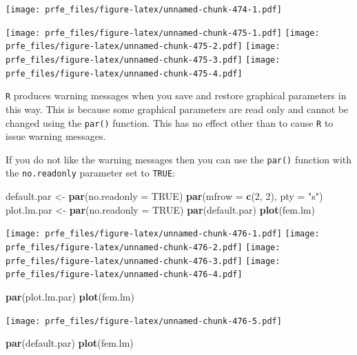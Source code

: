 \documentclass[12pt,a4paper]{book}
\newenvironment{Shaded}{\begin{snugshade}}{\end{snugshade}}
\newcommand{\DataTypeTok}[1]{\textcolor[rgb]{0.13,0.29,0.53}{#1}}
\newcommand{\DecValTok}[1]{\textcolor[rgb]{0.00,0.00,0.81}{#1}}
\newcommand{\KeywordTok}[1]{\textcolor[rgb]{0.13,0.29,0.53}{\textbf{#1}}}
\newcommand{\NormalTok}[1]{#1}
\newcommand{\OtherTok}[1]{\textcolor[rgb]{0.56,0.35,0.01}{#1}}
\newcommand{\StringTok}[1]{\textcolor[rgb]{0.31,0.60,0.02}{#1}}
\theoremstyle{definition}
\theoremstyle{definition}
\theoremstyle{definition}
\theoremstyle{remark}
\begin{document}
\texttt{[image: prfe\_files/figure-latex/unnamed-chunk-474-1.pdf]}

\texttt{[image: prfe\_files/figure-latex/unnamed-chunk-475-1.pdf]}
\texttt{[image: prfe\_files/figure-latex/unnamed-chunk-475-2.pdf]}
\texttt{[image: prfe\_files/figure-latex/unnamed-chunk-475-3.pdf]}
\texttt{[image: prfe\_files/figure-latex/unnamed-chunk-475-4.pdf]}

\texttt{R} produces warning messages when you save and restore graphical
parameters in this way. This is because some graphical parameters are
read only and cannot be changed using the \texttt{par()} function. This
has no effect other than to cause \texttt{R} to issue warning messages.

If you do not like the warning messages then you can use the
\texttt{par()} function with the \texttt{no.readonly} parameter set to
\texttt{TRUE}:

\begin{Shaded}
\begin{Highlighting}[]
\NormalTok{default.par <-}\StringTok{ }\KeywordTok{par}\NormalTok{(}\DataTypeTok{no.readonly =} \OtherTok{TRUE}\NormalTok{)}
\KeywordTok{par}\NormalTok{(}\DataTypeTok{mfrow =} \KeywordTok{c}\NormalTok{(}\DecValTok{2}\NormalTok{, }\DecValTok{2}\NormalTok{), }\DataTypeTok{pty =} \StringTok{"s"}\NormalTok{)}
\NormalTok{plot.lm.par <-}\StringTok{ }\KeywordTok{par}\NormalTok{(}\DataTypeTok{no.readonly =} \OtherTok{TRUE}\NormalTok{)}
\KeywordTok{par}\NormalTok{(default.par)}
\KeywordTok{plot}\NormalTok{(fem.lm)}
\end{Highlighting}
\end{Shaded}

\texttt{[image: prfe\_files/figure-latex/unnamed-chunk-476-1.pdf]}
\texttt{[image: prfe\_files/figure-latex/unnamed-chunk-476-2.pdf]}
\texttt{[image: prfe\_files/figure-latex/unnamed-chunk-476-3.pdf]}
\texttt{[image: prfe\_files/figure-latex/unnamed-chunk-476-4.pdf]}

\begin{Shaded}
\begin{Highlighting}[]
\KeywordTok{par}\NormalTok{(plot.lm.par)}
\KeywordTok{plot}\NormalTok{(fem.lm)}
\end{Highlighting}
\end{Shaded}

\texttt{[image: prfe\_files/figure-latex/unnamed-chunk-476-5.pdf]}

\begin{Shaded}
\begin{Highlighting}[]
\KeywordTok{par}\NormalTok{(default.par)}
\KeywordTok{plot}\NormalTok{(fem.lm)}
\end{Highlighting}
\end{Shaded}
\end{document}

